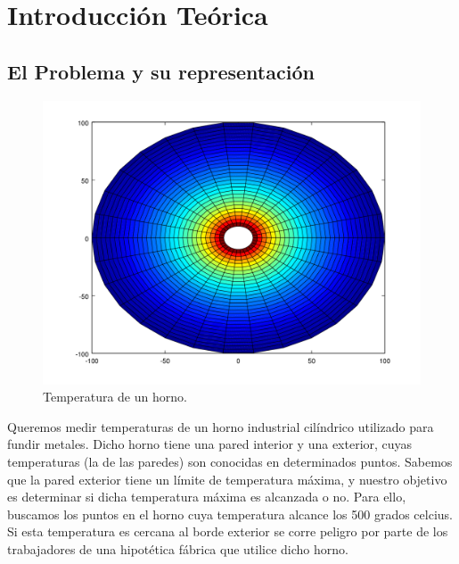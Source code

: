 \section{Introducción Teórica}

\subsection{El Problema y su representación}


\begin{figure}
  \vspace{-20pt}
  \begin{center}
    \includegraphics[scale= 0.4]{../hornoEjemplo.png}
  \end{center}
  \vspace{-20pt}
  \caption{Temperatura de un horno.}
  \vspace{-10pt}
  \label{fig:corteHorno}
\end{figure}

Queremos medir temperaturas de un horno industrial cilíndrico utilizado para fundir metales. Dicho horno tiene una pared interior y una exterior, cuyas temperaturas (la de las paredes) son conocidas en determinados puntos. Sabemos que la pared exterior tiene un límite de temperatura máxima, y nuestro objetivo es determinar si dicha temperatura máxima es alcanzada o no. Para ello, buscamos los puntos en el horno cuya temperatura alcance los 500 grados celcius.  Si esta temperatura es cercana al borde exterior se corre peligro por parte de los trabajadores de una hipotética fábrica que utilice dicho horno.




